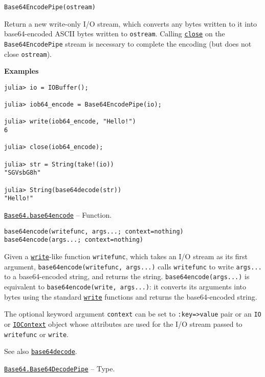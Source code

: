 \begin{adjustwidth}{2em}{0pt}


\begin{verbatim}
Base64EncodePipe(ostream)
\end{verbatim}

Return a new write-only I/O stream, which converts any bytes written to it into base64-encoded ASCII bytes written to \texttt{ostream}.  Calling \hyperlink{5331333469799487255}{\texttt{close}} on the \texttt{Base64EncodePipe} stream is necessary to complete the encoding (but does not close \texttt{ostream}).

\textbf{Examples}


\begin{verbatim}
julia> io = IOBuffer();

julia> iob64_encode = Base64EncodePipe(io);

julia> write(iob64_encode, "Hello!")
6

julia> close(iob64_encode);

julia> str = String(take!(io))
"SGVsbG8h"

julia> String(base64decode(str))
"Hello!"
\end{verbatim}



\end{adjustwidth}
\hypertarget{1446212874874362397}{}
\hyperlink{1446212874874362397}{\texttt{Base64.base64encode}}  -- {Function.}

\begin{adjustwidth}{2em}{0pt}


\begin{verbatim}
base64encode(writefunc, args...; context=nothing)
base64encode(args...; context=nothing)
\end{verbatim}

Given a \hyperlink{16947913578760238729}{\texttt{write}}-like function \texttt{writefunc}, which takes an I/O stream as its first argument, \texttt{base64encode(writefunc, args...)} calls \texttt{writefunc} to write \texttt{args...} to a base64-encoded string, and returns the string. \texttt{base64encode(args...)} is equivalent to \texttt{base64encode(write, args...)}: it converts its arguments into bytes using the standard \hyperlink{16947913578760238729}{\texttt{write}} functions and returns the base64-encoded string.

The optional keyword argument \texttt{context} can be set to \texttt{:key=>value} pair or an \texttt{IO} or \hyperlink{13454403377667762339}{\texttt{IOContext}} object whose attributes are used for the I/O stream passed to \texttt{writefunc} or \texttt{write}.

See also \hyperlink{7809304046524048078}{\texttt{base64decode}}.



\end{adjustwidth}
\hypertarget{3379294475433655298}{}
\hyperlink{3379294475433655298}{\texttt{Base64.Base64DecodePipe}}  -- {Type.}

